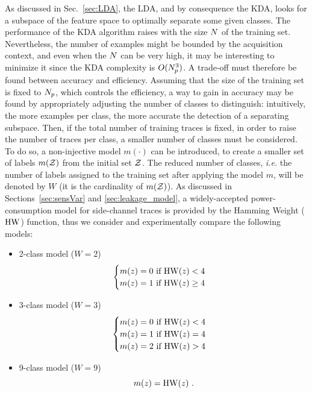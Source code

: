 As discussed in Sec.~\ref{sec:LDA}, the LDA, and by consequence the KDA, looks for a subspace of the feature space to optimally separate some given classes. The performance of the KDA algorithm raises with the size $N$ of the training set. Nevertheless, the number of examples might be bounded by the acquisition context, and even when the $N$ can be very high, it may be interesting to minimize it since the KDA complexity is $O(N_p^3)$. A trade-off must therefore be found between accuracy and efficiency. Assuming that the size of the training set  is fixed to $N_p$, which controls the efficiency, a way to gain in accuracy may be found by appropriately adjusting the number of classes to distinguish: intuitively, the more examples per class, the more accurate the detection of a separating subspace. Then, if the total number of training traces is fixed, in order to raise the number of traces per class, a smaller number of classes must be considered. To do so, a non-injective model $m(\cdot)$ can be introduced, to create a smaller set of labels $m(\mathcal{Z})$ from the initial set $\mathcal{Z}$. The reduced number of classes, \emph{i.e.} the number of labels assigned to the training set after applying the model $m$, will be denoted by $W$ (it is the cardinality of $m(\mathcal{Z})$).  As discussed in Sections~\ref{sec:sensVar} and \ref{sec:leakage_model}, a widely-accepted power-consumption model for side-channel traces is provided by the Hamming Weight ($\mathrm{HW}$) function, thus we consider and experimentally compare the following models:
\begin{itemize}
\item 2-class model ($W = 2$)
\begin{equation*}
\begin{cases}
m(z) =0 \mbox{ if } \mathrm{HW}(z)<4 \\
m(z) =1 \mbox{ if } \mathrm{HW}(z)\geq 4
\end{cases}
\end{equation*}

\item 3-class model ($W = 3$)
\begin{equation*}
\begin{cases}
m(z) =0 \mbox{ if } \mathrm{HW}(z)<4 \\
m(z) =1 \mbox{ if } \mathrm{HW}(z) = 4\\
m(z) =2 \mbox{ if } \mathrm{HW}(z)>4 
\end{cases}
\end{equation*}

\item 9-class model ($W = 9$)
\begin{equation*}
m(z) = \mathrm{HW}(z) \mbox{ .} 
\end{equation*}

\end{itemize}

